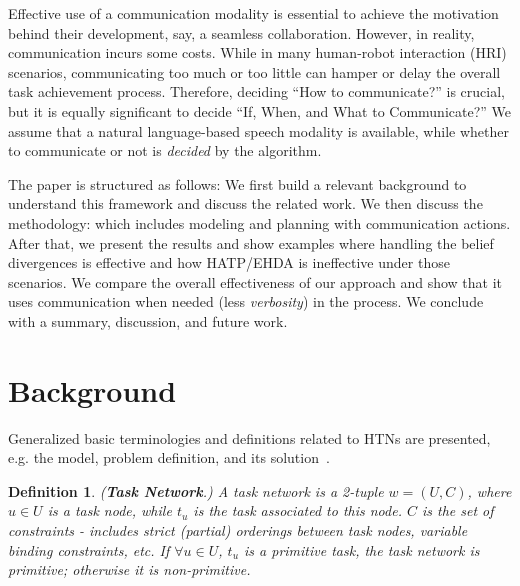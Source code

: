 \documentclass[letterpaper]{article} %
\newtheorem{definition}{Definition}
\begin{document}
Effective use of a communication modality is essential to achieve the motivation behind their development, say, a seamless collaboration. However, in reality, communication incurs some costs. 
While in many human-robot interaction (HRI) scenarios, communicating too much or too little can hamper or delay the overall task achievement process. 
Therefore, deciding ``How to communicate?'' is crucial, but it is equally significant to decide ``If, When, and What to Communicate?'' 
We assume that a natural language-based speech modality is available, while 
whether to communicate or not is \textit{decided} by the algorithm. 
%

The paper is structured as follows: We first build a relevant background to understand this framework and discuss the related work. We then discuss the methodology: which includes modeling and planning with communication actions. 
After that, we present the results and show examples where handling the belief divergences is effective and how HATP/EHDA is ineffective under those scenarios. We compare the overall effectiveness of our approach and show that it uses communication when needed (less \textit{verbosity}) in the process. 
We conclude with a summary, discussion, and future work.

\section{Background}

Generalized basic terminologies and definitions related to HTNs are presented, e.g. the model, problem definition, and its solution~\cite{naubooks0014222}.  
\begin{definition} 
(\textbf{Task Network}.) {A task network is a 2-tuple $w=(U,C)$, where $u\in U$ is a task node, while $t_u$ is the task associated to this node. $C$ is the set of constraints - includes strict (partial) orderings between task nodes, variable binding constraints, etc. If $\forall u \in U$, $t_u$ is a primitive task, the task network is primitive; otherwise it is non-primitive.}  
\end{definition}
\end{document}
